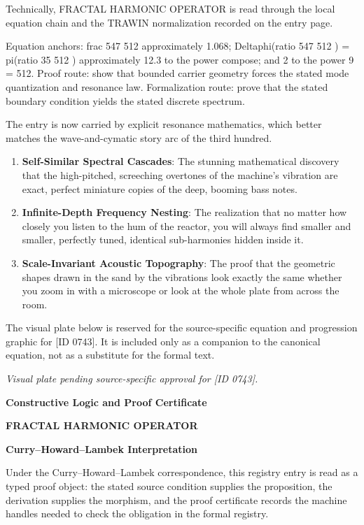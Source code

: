 Technically, FRACTAL HARMONIC OPERATOR is read through the local equation chain and the TRAWIN normalization recorded on the entry page.

Equation anchors: frac 547 512 approximately 1.068; Deltaphi(ratio 547 512 ) = pi(ratio 35 512 ) approximately 12.3 to the power compose; and 2 to the power 9 = 512. Proof route: show that bounded carrier geometry forces the stated mode quantization and resonance law. Formalization route: prove that the stated boundary condition yields the stated discrete spectrum.

The entry is now carried by explicit resonance mathematics, which better matches the wave-and-cymatic story arc of the third hundred.
\endgroup

\begin{enumerate}[leftmargin=1.6em,itemsep=6pt,topsep=4pt]
\item \textbf{Self-Similar Spectral Cascades}: The stunning mathematical discovery that the high-pitched, screeching overtones of the machine's vibration are exact, perfect miniature copies of the deep, booming bass notes.
\item \textbf{Infinite-Depth Frequency Nesting}: The realization that no matter how closely you listen to the hum of the reactor, you will always find smaller and smaller, perfectly tuned, identical sub-harmonies hidden inside it.
\item \textbf{Scale-Invariant Acoustic Topography}: The proof that the geometric shapes drawn in the sand by the vibrations look exactly the same whether you zoom in with a microscope or look at the whole plate from across the room.
\end{enumerate}

\begingroup\footnotesize\sloppy
The visual plate below is reserved for the source-specific equation and progression graphic for [ID 0743]. It is included only as a companion to the canonical equation, not as a substitute for the formal text.
\par\endgroup
\begingroup\footnotesize\itshape
Visual plate pending source-specific approval for [ID 0743].
\par\endgroup

\clearpage
\begingroup\tzpsupportsetup
\noindent\textbf{\fontsize{10.8pt}{12.8pt}\selectfont [ID 0743] Constructive Logic and Proof Certificate}\par
\noindent\textbf{\fontsize{10pt}{12pt}\selectfont FRACTAL HARMONIC OPERATOR}\par
\vspace{0.45em}
\begingroup
\footnotesize
\setlength{\parskip}{0.22em}
\setlength{\parindent}{0pt}
\noindent\textbf{Curry--Howard--Lambek Interpretation}\par
Under the Curry--Howard--Lambek correspondence, this registry entry is read as a typed proof
object: the stated source condition supplies the proposition, the derivation supplies the
morphism, and the proof certificate records the machine handles needed to check the obligation
in the formal registry.

